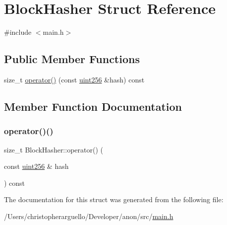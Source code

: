 \hypertarget{struct_block_hasher}{}\section{Block\+Hasher Struct Reference}
\label{struct_block_hasher}


{\ttfamily \#include $<$main.\+h$>$}

\subsection*{Public Member Functions}
\begin{DoxyCompactItemize}
\item 
size\+\_\+t \mbox{\hyperlink{struct_block_hasher_a10db0b419e8c9d86e848655a13b83490}{operator()}} (const \mbox{\hyperlink{classuint256}{uint256}} \&hash) const
\end{DoxyCompactItemize}


\subsection{Member Function Documentation}
\mbox{\label{struct_block_hasher_a10db0b419e8c9d86e848655a13b83490}} 
\subsubsection{\texorpdfstring{operator()()}{operator()()}}
{\footnotesize\ttfamily size\+\_\+t Block\+Hasher\+::operator() (\begin{DoxyParamCaption}\item[{const \mbox{\hyperlink{classuint256}{uint256}} \&}]{hash }\end{DoxyParamCaption}) const\hspace{0.3cm}{\ttfamily [inline]}}



The documentation for this struct was generated from the following file\+:\begin{DoxyCompactItemize}
\item 
/\+Users/christopherarguello/\+Developer/anon/src/\mbox{\hyperlink{main_8h}{main.\+h}}\end{DoxyCompactItemize}
